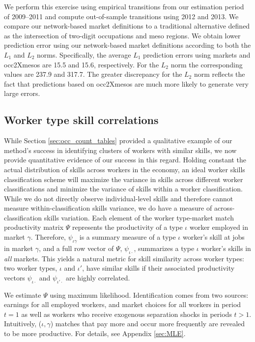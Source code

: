 \documentclass[12pt]{article}
\def\ig{\iota\gamma}
\def\g{\gamma}
\def\i{\iota}
\theoremstyle{definition}
\theoremstyle{plain}
\begin{document}
We perform this exercise using empirical transitions from our estimation period of 2009--2011 and compute out-of-sample transitions using 2012 and 2013. We compare our network-based market definitions to a traditional alternative defined as the intersection of two-digit occupations and meso regions. We obtain lower prediction error using our network-based market definitions according to both the $L_1$ and $L_2$ norms. Specifically, the average $L_1$ prediction errors using markets and occ2Xmesos are 15.5 and 15.6, respectively. For the  $L_2$ norm the corresponding values are 237.9 and 317.7. The greater discrepancy for the  $L_2$ norm reflects the fact that predictions based on occ2Xmesos are much more likely to generate very large errors. 




\subsection{Worker type skill correlations}

\label{sec:correlograms}



While Section \ref{sec:occ_count_tables} provided a qualitative example of our method's success in identifying clusters of workers with similar skills, we now provide quantitative evidence of our success in this regard. Holding constant the actual distribution of skills across workers in the economy, an ideal worker skills classification scheme will maximize the variance in skills across different worker classifications and minimize the variance of skills within a worker classification. While we do not directly observe individual-level skills and therefore cannot measure within-classification skills variance, we do have a measure of across-classification skills variation. Each element of the worker type-market match productivity matrix $\Psi$ represents the productivity of a type $\i$ worker employed in market $\g$. Therefore, $\psi_{\ig}$ is a summary measure of a type $\i$ worker's skill at jobs in market $\g$, and a full row vector of $\Psi$, $\psi_{\i\cdot}$, summarizes a type $\i$ worker's skills in \emph{all} markets. This yields a natural metric for skill similarity across worker types: two worker types, $\i$ and $\i'$, have similar skills if their associated productivity vectors $\psi_{\i\cdot}$ and $\psi_{\i'\cdot}$ are highly correlated.


We estimate $\Psi$ using maximum likelihood. Identification comes from two sources: earnings for all employed workers, and market choices for all workers in period $t=1$ as well as workers who receive exogenous separation shocks in periods $t>1$. Intuitively, ($\i,\g$) matches that pay more and occur more frequently are revealed to be more productive. For details, see Appendix \ref{sec:MLE}.
\end{document}
